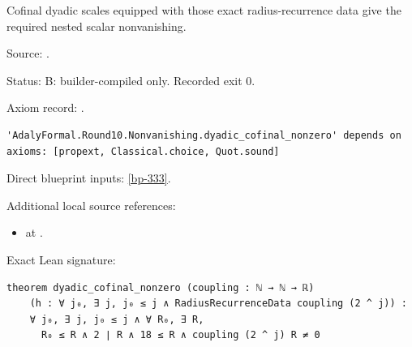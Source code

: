 \begin{theorem}[bp-334]
\label{bp-334}
\leanok
Cofinal dyadic scales equipped with those exact radius-recurrence data give the required nested scalar nonvanishing.

\par Source: \texttt{}.
\par Status: B: builder-compiled only. Recorded exit 0.
\par Axiom record: \texttt{}.
\begin{verbatim}
'AdalyFormal.Round10.Nonvanishing.dyadic_cofinal_nonzero' depends on axioms: [propext, Classical.choice, Quot.sound]
\end{verbatim}
\par Direct blueprint inputs: \ref{bp-333}.
\par Additional local source references:
\begin{itemize}
\item \texttt{} at \texttt{}.
\end{itemize}
\par Exact Lean signature:
\begin{verbatim}
theorem dyadic_cofinal_nonzero (coupling : ℕ → ℕ → ℝ)
    (h : ∀ j₀, ∃ j, j₀ ≤ j ∧ RadiusRecurrenceData coupling (2 ^ j)) :
    ∀ j₀, ∃ j, j₀ ≤ j ∧ ∀ R₀, ∃ R,
      R₀ ≤ R ∧ 2 ∣ R ∧ 18 ≤ R ∧ coupling (2 ^ j) R ≠ 0
\end{verbatim}
\end{theorem}

